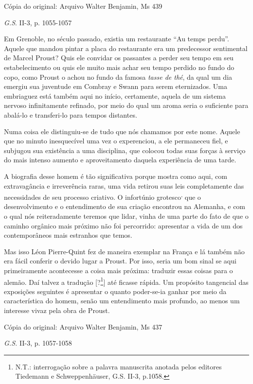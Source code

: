 Cópia do original: Arquivo Walter Benjamin, Ms 439

\emph{G.S}. II-3, p. 1055-1057

Em Grenoble, no século passado, existia um restaurante ``Au temps
perdu''. Aquele que mandou pintar a placa do restaurante era um
predecessor sentimental de Marcel Proust? Quis ele convidar os passantes
a perder seu tempo em seu estabelecimento ou quis ele muito mais achar
seu tempo perdido no fundo do copo, como Proust o achou no fundo da
famosa \emph{tasse de thé}, da qual um dia emergiu sua juventude em
Combray e Swann para serem eternizados. Uma embriaguez está também aqui
no início, certamente, aquela de um sistema nervoso infinitamente
refinado, por meio do qual um aroma seria o suficiente para abalá-lo e
transferi-lo para tempos distantes.

Numa coisa ele distinguiu-se de tudo que nós chamamos por este nome.
Aquele que no minuto inesquecível uma vez o experenciou, a ele
permaneceu fiel, e subjugou sua existência a uma disciplina, que colocou
todas suas forças à serviço do mais intenso aumento e aproveitamento
daquela experiência de uma tarde.

A biografia desse homem é tão significativa porque mostra como aqui, com
extravagância e irreverência raras, uma vida retirou suas leis
completamente das necessidades de seu processo criativo. O infortúnio
grotesco\textsuperscript{,} que o desenvolvimento e o entendimento de
sua criação encontrou na Alemanha, e com o qual nós reiteradamente
teremos que lidar, vinha de uma parte do fato de que o caminho orgânico
mais próximo não foi percorrido: apresentar a vida de um dos
contemporâneos mais estranhos que temos.

Mas isso Léon Pierre-Quint fez de maneira exemplar na França e lá também
não era fácil conferir o devido lugar a Proust. Por isso, seria um bom
sinal se aqui primeiramente acontecesse a coisa mais próxima: traduzir
essas coisas para o alemão. Daí talvez a tradução {[}?\footnote{N.T.:
  interrogação sobre a palavra manuscrita anotada pelos editores
  Tiedemann e Schweppenhäuser, G.S. II-3, p.1058.}{]} até ficasse
rápida. Um propósito tangencial das exposições seguintes é apresentar o
quanto poder-se-ia ganhar por meio da característica do homem, senão um
entendimento mais profundo, ao menos um interesse vivaz pela obra de
Proust.

Cópia do original: Arquivo Walter Benjamin, Ms 437

\emph{G.S.} II-3, p. 1057-1058

